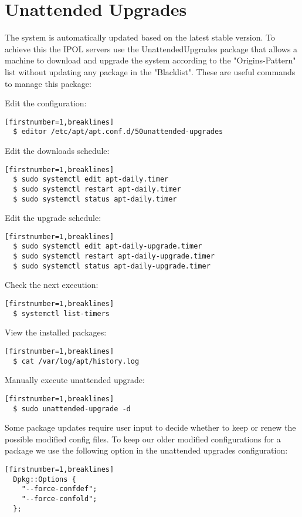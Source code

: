 \documentclass[a4paper,12pt]{article}
\begin{document}
\section{Unattended Upgrades}

The system is automatically updated based on the latest stable version. To achieve this the IPOL servers use the UnattendedUpgrades package that allows a machine to download and upgrade the system according to the "Origins-Pattern" list without updating any package in the "Blacklist". These are useful commands to manage this package: 

Edit the configuration: 
\begin{verbatim}[firstnumber=1,breaklines]
  $ editor /etc/apt/apt.conf.d/50unattended-upgrades
\end{verbatim}

Edit the downloads schedule: 
\begin{verbatim}[firstnumber=1,breaklines]
  $ sudo systemctl edit apt-daily.timer
  $ sudo systemctl restart apt-daily.timer
  $ sudo systemctl status apt-daily.timer
\end{verbatim}

Edit the upgrade schedule: 
\begin{verbatim}[firstnumber=1,breaklines]
  $ sudo systemctl edit apt-daily-upgrade.timer
  $ sudo systemctl restart apt-daily-upgrade.timer
  $ sudo systemctl status apt-daily-upgrade.timer
\end{verbatim}

Check the next execution: 
\begin{verbatim}[firstnumber=1,breaklines]
  $ systemctl list-timers
\end{verbatim}

View the installed packages: 
\begin{verbatim}[firstnumber=1,breaklines]
  $ cat /var/log/apt/history.log
\end{verbatim}

Manually execute unattended upgrade:
\begin{verbatim}[firstnumber=1,breaklines]
  $ sudo unattended-upgrade -d
\end{verbatim}

Some package updates require user input to decide whether to keep or renew the possible modified config files. To keep our older modified configurations for a package we use the following option in the unattended upgrades configuration:

\begin{verbatim}[firstnumber=1,breaklines]
  Dpkg::Options {
    "--force-confdef";
    "--force-confold";
  };
\end{verbatim}
\end{document}
